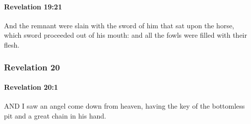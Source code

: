 		\paragraph{Revelation 19:21} %
			\label{REVELATIONNT-19-21}

			And the remnant were slain with the sword of him that sat upon the horse, which sword proceeded out of his mouth: and all the fowls were filled with their flesh.

			\begin{framed}
			\scriptsize
				\begin{compactdesc}
					\item[SBLG] 
				\end{compactdesc}
			\end{framed}

	\subsubsection{Revelation 20} %
		\label{REVELATIONNT-20}
		
		\paragraph{Revelation 20:1} %
			\label{REVELATIONNT-20-1}

			AND I saw an angel come down from heaven, having the key of the bottomless pit and a great chain in his hand.

